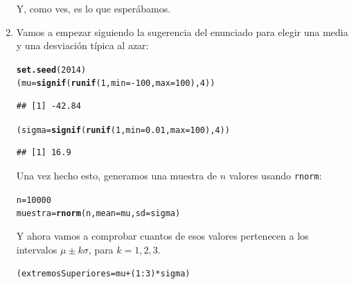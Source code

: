 \documentclass[10pt,a4paper]{article}\usepackage[]{graphicx}\usepackage[]{color}
\makeatletter
\newcommand{\hlnum}[1]{\textcolor[rgb]{0.686,0.059,0.569}{#1}}%
\newcommand{\hlopt}[1]{\textcolor[rgb]{0,0,0}{#1}}%
\newcommand{\hlstd}[1]{\textcolor[rgb]{0.345,0.345,0.345}{#1}}%
\newcommand{\hlkwb}[1]{\textcolor[rgb]{0.69,0.353,0.396}{#1}}%
\newcommand{\hlkwc}[1]{\textcolor[rgb]{0.333,0.667,0.333}{#1}}%
\newcommand{\hlkwd}[1]{\textcolor[rgb]{0.737,0.353,0.396}{\textbf{#1}}}%
\newenvironment{kframe}{%
 \def\at@end@of@kframe{}%
 \ifinner\ifhmode%
  \def\at@end@of@kframe{\end{minipage}}%
  \begin{minipage}{\columnwidth}%
 \fi\fi%
 \def\FrameCommand##1{\hskip\@totalleftmargin \hskip-\fboxsep
 \colorbox{shadecolor}{##1}\hskip-\fboxsep
     \hskip-\linewidth \hskip-\@totalleftmargin \hskip\columnwidth}%
 \MakeFramed {\advance\hsize-\width
   \@totalleftmargin\z@ \linewidth\hsize
   \@setminipage}}%
 {\par\unskip\endMakeFramed%
 \at@end@of@kframe}
\newenvironment{knitrout}{}{} %
\makeatother
\begin{document}
\begin{enumerate}
\begin{knitrout}
\end{knitrout}
        Y, como ves, es lo que esperábamos.

\item Vamos a empezar siguiendo la sugerencia del enunciado para elegir una media y una desviación típica al azar:
\begin{knitrout}
\color{fgcolor}\begin{kframe}
\begin{alltt}
\hlkwd{set.seed}\hlstd{(}\hlnum{2014}\hlstd{)}
\hlstd{(mu} \hlkwb{=} \hlkwd{signif}\hlstd{(}\hlkwd{runif}\hlstd{(}\hlnum{1}\hlstd{,} \hlkwc{min} \hlstd{=} \hlopt{-}\hlnum{100}\hlstd{,} \hlkwc{max} \hlstd{=} \hlnum{100}\hlstd{),} \hlnum{4}\hlstd{))}
\end{alltt}
\begin{verbatim}
## [1] -42.84
\end{verbatim}
\begin{alltt}
\hlstd{(sigma} \hlkwb{=} \hlkwd{signif}\hlstd{(}\hlkwd{runif}\hlstd{(}\hlnum{1}\hlstd{,} \hlkwc{min} \hlstd{=} \hlnum{0.01}\hlstd{,} \hlkwc{max} \hlstd{=} \hlnum{100}\hlstd{),} \hlnum{4}\hlstd{))}
\end{alltt}
\begin{verbatim}
## [1] 16.9
\end{verbatim}
\end{kframe}
\end{knitrout}
    Una vez hecho esto, generamos una muestra de $n$ valores usando {\tt rnorm}:
\begin{knitrout}
\color{fgcolor}\begin{kframe}
\begin{alltt}
\hlstd{n} \hlkwb{=} \hlnum{10000}
\hlstd{muestra} \hlkwb{=} \hlkwd{rnorm}\hlstd{(n,} \hlkwc{mean} \hlstd{= mu,} \hlkwc{sd}\hlstd{=sigma)}
\end{alltt}
\end{kframe}
\end{knitrout}
    Y ahora vamos a comprobar cuantos de esos valores pertenecen a los intervalos $\mu\pm k\sigma $, para $k =1, 2, 3$.
\begin{knitrout}
\color{fgcolor}\begin{kframe}
\begin{alltt}
\hlstd{(extremosSuperiores} \hlkwb{=} \hlstd{mu} \hlopt{+} \hlstd{(}\hlnum{1}\hlopt{:}\hlnum{3}\hlstd{)} \hlopt{*} \hlstd{sigma)}
\end{alltt}

\end{kframe}
\end{knitrout}
\end{enumerate}
\end{document}
